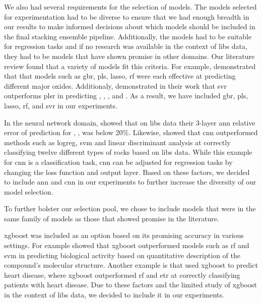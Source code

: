 We also had several requirements for the selection of models.
The models selected for experimentation had to be diverse to ensure that we had enough breadth in our results to make informed decisions about which models should be included in the final stacking ensemble pipeline.
Additionally, the models had to be suitable for regression tasks and if no research was available in the context of \gls{libs} data, they had to be models that have shown promise in other domains.
Our literature review found that a variety of models fit this criteria.
For example, \citet{andersonPostlandingMajorElement2022} demonstrated that that models such as \gls{gbr}, \gls{pls}, \gls{lasso}, \gls{rf} were each effective at predicting different major oxides.
Additionaly, \citet{svrforlibs} demonstrated in their work that \gls{svr} outperforms \gls{plsr} in predicting , , ,  and .
As a result, we have included \gls{gbr}, \gls{pls}, \gls{lasso}, \gls{rf}, and \gls{svr} in our experiments.

In the neural network domain, \cite{ann_libs_soil_analysis} showed that on \gls{libs} data their 3-layer \gls{ann} relative error of prediction for , ,  was below 20\%.
Likewise, \citet{yangConvolutionalNeuralNetwork2022} showed that \gls{cnn} outperformed methods such as \gls{logreg}, \gls{svm} and linear discriminant analysis at correctly classifying twelve different types of rocks based on \gls{libs} data. 
While this example for \gls{cnn} is a classification task, \gls{cnn} can be adjusted for regression tasks by changing the loss function and output layer.
Based on these factors, we decided to include \gls{ann} and \gls{cnn} in our experiments to further increase the diversity of our model selection.

To further bolster our selection pool, we chose to include models that were in the same family of models as those that showed promise in the literature.

\gls{xgboost} was included as an option based on its promising accuracy in various settings.
For example \citet{xgboost_in_biomedicie} showed that \gls{xgboost} outperformed models such as \gls{rf} and \gls{svm} in predicting biological activity based on quantitative description of the compound's molecular structure. 
Another example is \citet{xgboost_in_heart_disease} that used \gls{xgboost} to predict heart disease, where \gls{xgboost} outperformed \gls{rf} and \gls{etr} at correctly classifying patients with heart disease.
Due to these factors and the limited study of \gls{xgboost} in the context of \gls{libs} data, we decided to include it in our experiments.

